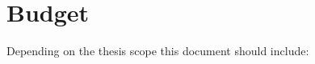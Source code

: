 \clearpage\section{Budget}
 {
  \foreignlanguage{english}{Depending on the thesis scope this document should include:}}
